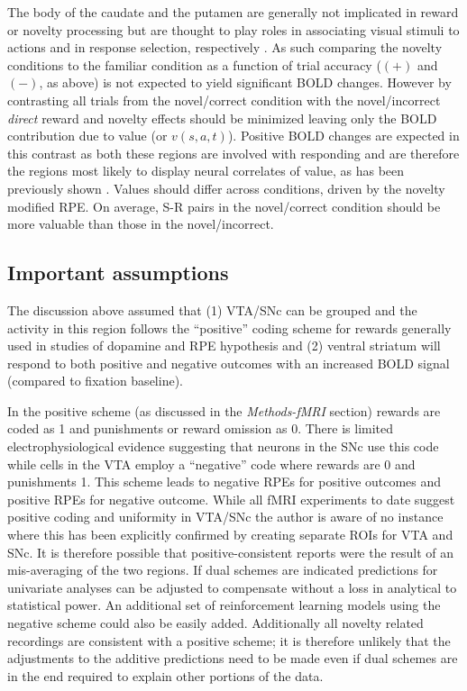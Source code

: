 \documentclass[doc]{apa}        %
\begin{document}
The body of the caudate and the putamen are generally not implicated in reward or novelty processing but are thought to play roles in associating visual stimuli to actions and in response selection, respectively \cite{Seger:2008p6401,Seger:2010p7188}.  As such comparing the novelty conditions to the familiar condition as a function of trial accuracy ($(+)$ and $(-)$, as above) is not expected to yield significant BOLD changes.  However by contrasting all trials from the novel/correct condition with the novel/incorrect \emph{direct} reward and novelty effects should be minimized leaving only the BOLD contribution due to value (or $v(s,a,t)$).  Positive BOLD changes are expected in this contrast as both these regions are involved with responding and are therefore the regions most likely to display neural correlates of value, as has been previously shown \cite{Seger:2010p7188,Haruno:2006p3979}. Values should differ across conditions, driven by the novelty modified RPE.  On average, S-R pairs in the novel/correct condition should be more valuable than those in the novel/incorrect.


\subsection{Important assumptions} %
\label{sub:important_assumptions}
The discussion above assumed that (1) VTA/SNc can be grouped and the activity in this region follows the ``positive'' coding scheme for rewards generally used in studies of dopamine and RPE hypothesis and (2) ventral striatum will respond to both positive and negative outcomes with an increased BOLD signal (compared to fixation baseline). 

In the positive scheme (as discussed in the \emph{Methods-fMRI} section) rewards are coded as 1 and punishments or reward omission as 0.  There is limited electrophysiological evidence suggesting that neurons in the SNc use this code while cells in the VTA employ a ``negative'' code where rewards are 0 and punishments 1.  This scheme leads to negative RPEs for positive outcomes and positive RPEs for negative outcome. While all fMRI experiments to date suggest positive coding and uniformity in VTA/SNc the author is aware of no instance where this has been explicitly confirmed by creating separate ROIs for VTA and SNc.  It is therefore possible that positive-consistent reports were the result of an mis-averaging of the two regions.  If dual schemes are indicated predictions for univariate analyses can be adjusted to compensate without a loss in analytical to statistical power.  An additional set of reinforcement learning models using the negative scheme could also be easily added.  Additionally all novelty related recordings are consistent with a positive scheme; it is therefore unlikely that the adjustments to the additive predictions need to be made even if dual schemes are in the end required to explain other portions of the data.
\end{document}
